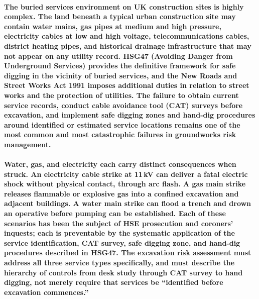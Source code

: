 \paragraph{The buried services environment on UK construction sites is highly complex. The land beneath a typical urban construction site may contain water mains, gas pipes at medium and high pressure, electricity cables at low and high voltage, telecommunications cables, district heating pipes, and historical drainage infrastructure that may not appear on any utility record. HSG47 (Avoiding Danger from Underground Services) provides the definitive framework for safe digging in the vicinity of buried services, and the New Roads and Street Works Act 1991 imposes additional duties in relation to street works and the protection of utilities. The failure to obtain current service records, conduct cable avoidance tool (CAT) surveys before excavation, and implement safe digging zones and hand-dig procedures around identified or estimated service locations remains one of the most common and most catastrophic failures in groundworks risk management.}

\paragraph{Water, gas, and electricity each carry distinct consequences when struck. An electricity cable strike at 11\,kV can deliver a fatal electric shock without physical contact, through arc flash. A gas main strike releases flammable or explosive gas into a confined excavation and adjacent buildings. A water main strike can flood a trench and drown an operative before pumping can be established. Each of these scenarios has been the subject of HSE prosecution and coroners' inquests; each is preventable by the systematic application of the service identification, CAT survey, safe digging zone, and hand-dig procedures described in HSG47. The excavation risk assessment must address all three service types specifically, and must describe the hierarchy of controls from desk study through CAT survey to hand digging, not merely require that services be ``identified before excavation commences.''}


